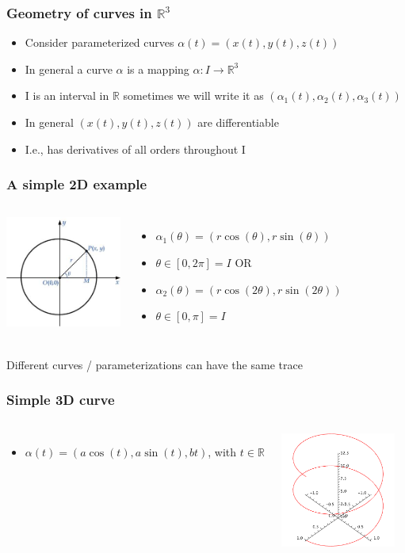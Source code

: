 \documentclass[10pt]{beamer}
\begin{document}
\begin{frame}
  \frametitle{Geometry of curves in $\mathbb{R}^3$}
  \begin{itemize}
  \item Consider parameterized curves $\alpha (t) = (x(t), y(t), z(t))$
  \item In general a curve $\alpha$ is a mapping $\alpha: I \rightarrow \mathbb{R}^3$
  \item I is an interval in $\mathbb{R}$ sometimes we will write it as $(\alpha_1 (t), \alpha_2 (t), \alpha_3 (t))$
  \item In general $(x(t), y(t), z(t))$ are differentiable
  \item I.e., has derivatives of all orders throughout I
  \end{itemize}
\end{frame}

\begin{frame}
  \frametitle{A simple 2D example}
  \begin{columns}
    \column{4cm}
    \vfill
    \centerline{\includegraphics[width=3.8cm]{circle}}
    \vfill
    \column{7cm}
    \begin{itemize}
    \item $\alpha_1 (\theta) = (r \cos (\theta), r \sin (\theta))$
    \item $\theta \in [0, 2 \pi] = I$ OR
    \item $\alpha_2 (\theta) = (r \cos (2 \theta), r \sin (2\theta))$
    \item $\theta \in [0, \pi] = I$ 
    \end{itemize}
  \end{columns}
  \centering
  Different curves / parameterizations can have the same trace
\end{frame}

\begin{frame}
  \frametitle{Simple 3D curve}
  \begin{columns}
    \column{7cm}
    \begin{itemize}
    \item $\alpha (t) = ( a \cos(t), a \sin(t), b t)$, with $ t \in \mathbb{R}$
    \end{itemize}
    \column{4cm}
    \centerline{\includegraphics[width=3.8cm]{helix1}}
  \end{columns}
\end{frame}
\end{document}
